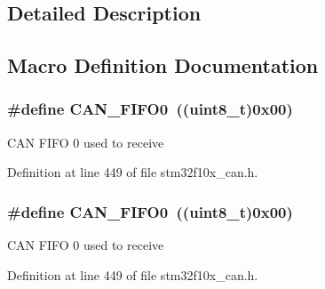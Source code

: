 \subsection{Detailed Description}


\subsection{Macro Definition Documentation}
\subsubsection[{\texorpdfstring{C\+A\+N\+\_\+\+F\+I\+F\+O0}{CAN_FIFO0}}]{\setlength{\rightskip}{0pt plus 5cm}\#define C\+A\+N\+\_\+\+F\+I\+F\+O0~(({\bf uint8\+\_\+t})0x00)}\hypertarget{group___c_a_n__receive___f_i_f_o__number__constants_ga8f52eeefb86b2af5b7c3b4b75fa4d114}{}\label{group___c_a_n__receive___f_i_f_o__number__constants_ga8f52eeefb86b2af5b7c3b4b75fa4d114}
C\+AN F\+I\+FO 0 used to receive 

Definition at line 449 of file stm32f10x\+\_\+can.\+h.

\subsubsection[{\texorpdfstring{C\+A\+N\+\_\+\+F\+I\+F\+O0}{CAN_FIFO0}}]{\setlength{\rightskip}{0pt plus 5cm}\#define C\+A\+N\+\_\+\+F\+I\+F\+O0~(({\bf uint8\+\_\+t})0x00)}\hypertarget{group___c_a_n__receive___f_i_f_o__number__constants_ga8f52eeefb86b2af5b7c3b4b75fa4d114}{}\label{group___c_a_n__receive___f_i_f_o__number__constants_ga8f52eeefb86b2af5b7c3b4b75fa4d114}
C\+AN F\+I\+FO 0 used to receive 

Definition at line 449 of file stm32f10x\+\_\+can.\+h.

